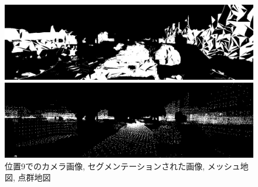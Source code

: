 \begin{figure}[htbp]
\begin{minipage}[b]{0.50\hsize}
\begin{center}
  \end{center}
 \end{minipage} \\
  \begin{minipage}[b]{0.50\hsize}
 \begin{center}
  \includegraphics[keepaspectratio, scale=0.18]{./picture/valued_mesh_map_image/image8.jpg}
  \end{center}
 \end{minipage}
 \begin{minipage}[b]{0.50\hsize}
 \begin{center}
  \includegraphics[keepaspectratio, scale=0.18]{./picture/valued_point_map_image/image8.jpg}
  \end{center}
 \end{minipage}
 \caption{位置9でのカメラ画像, セグメンテーションされた画像, メッシュ地図, 点群地図}\label{fig:place9}
\end{figure}

